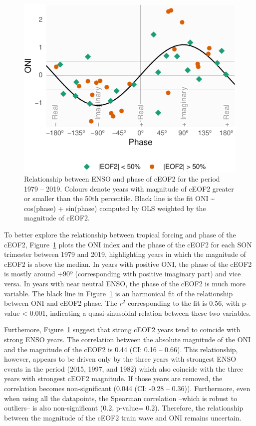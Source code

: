 \documentclass[smallextended]{svjour3}       %
\begin{document}
\begin{figure}
\centering
\includegraphics{../figures/enso-phase-1.pdf}
\caption{\label{fig:enso-phase}Relationship between ENSO and phase of cEOF2 for the period 1979 -- 2019. Colours denote years with magnitude of cEOF2 greater or smaller than the 50th percentile. Black line is the fit ONI \textasciitilde{} cos(phase) + sin(phase) computed by OLS weighted by the magnitude of cEOF2.}
\end{figure}

To better explore the relationship between tropical forcing and phase of the cEOF2, Figure~\ref{fig:enso-phase} plots the ONI index and the phase of the cEOF2 for each SON trimester between 1979 and 2019, highlighting years in which the magnitude of cEOF2 is above the median. In years with positive ONI, the phase of the cEOF2 is mostly around +90º (corresponding with positive imaginary part) and vice versa. In years with near neutral ENSO, the phase of the cEOF2 is much more variable. The black line in Figure~\ref{fig:enso-phase} is an harmonical fit of the relationship between ONI and cEOF2 phase. The \(r^2\) corresponding to the fit is 0.56, with p-value \textless{} 0.001, indicating a quasi-sinusoidal relation between these two variables.

Furthemore, Figure~\ref{fig:enso-phase} suggest that strong cEOF2 years tend to coincide with strong ENSO years. The correlation between the absolute magnitude of the ONI and the magnitude of the cEOF2 is 0.44 (CI: 0.16 -- 0.66). This relationship, however, appears to be driven only by the three years with strongest ENSO events in the period (2015, 1997, and 1982) which also coincide with the three years with strongest cEOF2 magnitude. If those years are removed, the correlation becomes non-significant (0.044 (CI: -0.28 -- 0.36)). Furthermore, even when using all the datapoints, the Spearman correlation --which is robust to outliers-- is also non-significant (0.2, p-value= 0.2). Therefore, the relationship between the magnitude of the cEOF2 train wave and ONI remains uncertain.
\end{document}
